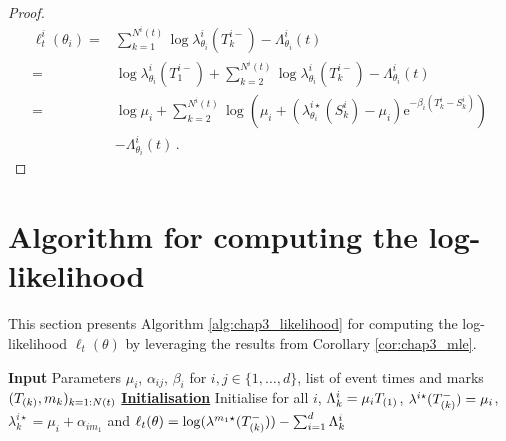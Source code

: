 \begin{subappendices}
\begin{proof}
            \begin{align*}
              \ell_t^{i}(\theta_i)
              = &\sum_{k=1}^{N^i(t)}{\log{\lambda^i_{\theta_i}(T_k^{i-})}} - \Lambda_{\theta_i}^i(t) \\
              = &\log{\lambda^i_{\theta_i}(T_1^{i-})} + \sum_{k=2}^{N^i(t)}{\log{\lambda^i_{\theta_i}(T_k^{i-})}} - \Lambda_{\theta_i}^i(t) \\
              = &\log{\mu_i} + \sum_{k=2}^{N^i(t)}{\log \left(\mu_i + \left(\lambda_{\theta_i}^{i\star}(S_k^i) - \mu_i\right)\mathrm{e}^{-\beta_i(T_k^{i}-S_k^i)} \right)}\\
              &- \Lambda_{\theta_i}^i(t) \,.
            \end{align*}
      \end{proof}
  
  
  \section{Algorithm for computing the log-likelihood}
  \label{app:chap3_log-lik}
  
  This section presents Algorithm \ref{alg:chap3_likelihood} for computing the log-likelihood $\ell_t(\theta)$ by leveraging the results from Corollary \ref{cor:chap3_mle}.
    \begin{algorithm}[!ht]
    \SetAlgoLined
     \textbf{Input} Parameters $\mu_i$, $\alpha_{ij}$, $\beta_i$ for $i,j\in\{1,\ldots, d\}$, list of event times and marks $(T\park, m_k)_{k=1:N(t)}$\;
     \textbf{\underline{Initialisation}} Initialise for all $i$, $\Lambda^i_k = \mu_i T\park[1]$, $\lambda^{i\star}(T\park^-) = \mu_i$, $\lambda_k^{i\star} = \mu_i + \alpha_{im_1}$ and $\ell_t(\theta) = \log(\lambda^{m_1\star}(T\park^-)) - \sum_{i=1}^{d}{\Lambda^i_k}$\;
\end{algorithm}
\end{subappendices}

